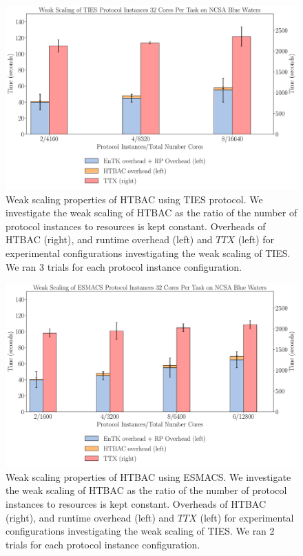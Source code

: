 \begin{figure}
  \centering
    \includegraphics[width=\columnwidth]{figures/new_ws_ties.pdf}
    \caption{Weak scaling properties of HTBAC using TIES protocol. We 
    investigate the weak scaling of HTBAC as the ratio of the number of protocol 
    instances to resources is kept constant. Overheads of HTBAC (right), and 
    runtime overhead (left) and \(TTX\) (left) for experimental configurations
    investigating the weak scaling of TIES. We ran 3 trials for each protocol
    instance configuration.}
\label{fig:weak_scaling_TIES}
\end{figure}

\begin{figure}
  \centering
    \includegraphics[width=\columnwidth]{figures/new_ws_esmacs.pdf}
    \caption{Weak scaling properties of HTBAC using ESMACS. We investigate the 
    weak scaling of HTBAC as the ratio of the number of protocol instances to
    resources is kept constant. Overheads of HTBAC (right), and runtime
    overhead (left) and \(TTX\) (left) for experimental configurations
    investigating the weak scaling of TIES. We ran 2 trials for each protocol
    instance configuration.}
\label{fig:weak_scaling_ESMACS}
\end{figure}


